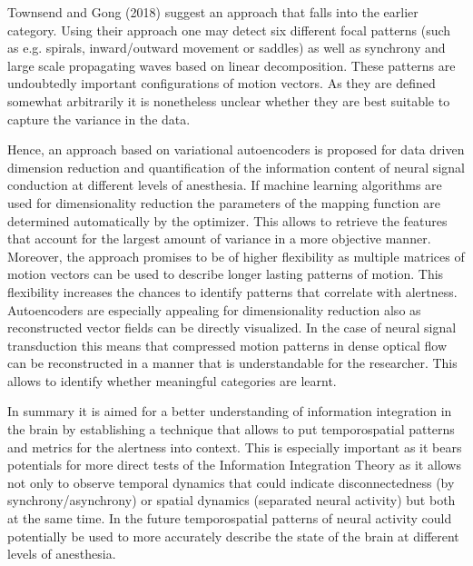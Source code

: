 Townsend and Gong (2018) suggest an approach that falls into the earlier category. Using their approach one may detect six different focal patterns (such as e.g. spirals, inward/outward movement or saddles) as well as synchrony and large scale propagating waves based on linear decomposition. These patterns are undoubtedly important configurations of motion vectors. As they are defined somewhat arbitrarily it is nonetheless unclear whether they are best suitable to capture the variance in the data.

Hence, an approach based on variational autoencoders is proposed for data driven dimension reduction and quantification of the information content of neural signal conduction at different levels of anesthesia. If machine learning algorithms are used for dimensionality reduction the parameters of the mapping function are determined automatically by the optimizer. This allows to retrieve the features that account for the largest amount of variance in a more objective manner. Moreover, the approach promises to be of higher flexibility as multiple matrices of motion vectors can be used to describe longer lasting patterns of motion. This flexibility increases the chances to identify patterns that correlate with alertness. Autoencoders are especially appealing for dimensionality reduction also as reconstructed vector fields can be directly visualized. In the case of neural signal transduction this means that compressed motion patterns in dense optical flow can be reconstructed in a manner  that is understandable for the researcher. This allows to identify whether meaningful categories are learnt.

In summary it is aimed for a better understanding of information integration in the brain by establishing a technique that allows to put temporospatial patterns and metrics for the alertness into context. This is especially important as it bears potentials for more direct tests of the Information Integration Theory as it allows not only to observe temporal dynamics that could indicate disconnectedness (by synchrony/asynchrony) or spatial dynamics (separated neural activity) but both at the same time. In the future temporospatial patterns of neural activity could potentially be used to more accurately describe the state of the brain at different levels of anesthesia.